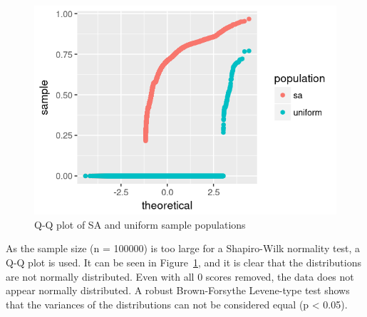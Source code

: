 \begin{figure}
    \includegraphics[width=\textwidth]{figures/sa-qq}
    \caption[Q-Q plot of SA and uniform sample populations]{Q-Q plot of \gls{SA} and uniform sample populations}
    \label{fig:sa-qq}
\end{figure}

As the sample size (n = 100000) is too large for a Shapiro-Wilk normality test, a Q-Q plot is used.
It can be seen in Figure~\ref{fig:sa-qq}, and it is clear that the distributions are not normally distributed.
Even with all 0 scores removed, the data does not appear normally distributed.
A robust Brown-Forsythe Levene-type test shows that the variances of the distributions can not be considered equal (p < 0.05).

